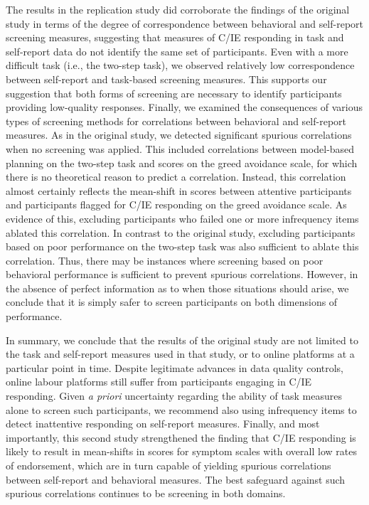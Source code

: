 \documentclass[a4paper,notitlepage,12pt]{article}
\begin{document}
\begin{refsection}[supp]
The results in the replication study did corroborate the findings of the original study in terms of the degree of correspondence between behavioral and self-report screening measures, suggesting that measures of C/IE responding in task and self-report data do not identify the same set of participants. Even with a more difficult task (i.e., the two-step task), we observed relatively low correspondence between self-report and task-based screening measures. This supports our suggestion that both forms of screening are necessary to identify participants providing low-quality responses. Finally, we examined the consequences of various types of screening methods for correlations between behavioral and self-report measures. As in the original study, we detected significant spurious correlations when no screening was applied. This included correlations between model-based planning on the two-step task and scores on the greed avoidance scale, for which there is no theoretical reason to predict a correlation. Instead, this correlation almost certainly reflects the mean-shift in scores between attentive participants and participants flagged for C/IE responding on the greed avoidance scale. As evidence of this, excluding participants who failed one or more infrequency items ablated this correlation. In contrast to the original study, excluding participants based on poor performance on the two-step task was also sufficient to ablate this correlation. Thus, there may be instances where screening based on poor behavioral performance is sufficient to prevent spurious correlations. However, in the absence of perfect information as to when those situations should arise, we conclude that it is simply safer to screen participants on both dimensions of performance. 

In summary, we conclude that the results of the original study are not limited to the task and self-report measures used in that study, or to online platforms at a particular point in time. Despite legitimate advances in data quality controls, online labour platforms still suffer from participants engaging in C/IE responding. Given \textit{a priori} uncertainty regarding the ability of task measures alone to screen such participants, we recommend also using infrequency items to detect inattentive responding on self-report measures. Finally, and most importantly, this second study strengthened the finding that C/IE responding is likely to result in mean-shifts in scores for symptom scales with overall low rates of endorsement, which are in turn capable of yielding spurious correlations between self-report and behavioral measures. The best safeguard against such spurious correlations continues to be screening in both domains. 


\end{refsection}
\end{document}

